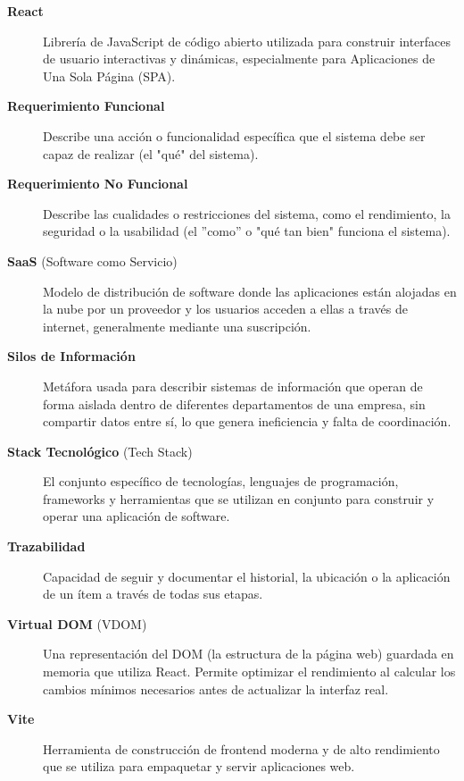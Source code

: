 \documentclass[12pt,letterpaper,spanish]{report}
\begin{document}
\begin{description}
  \item[\textbf{React}] Librería de JavaScript de código abierto utilizada para construir interfaces de usuario interactivas y dinámicas, especialmente para Aplicaciones de Una Sola Página (SPA).
  \item[\textbf{Requerimiento Funcional}] Describe una acción o funcionalidad específica que el sistema debe ser capaz de realizar (el "qué" del sistema).

  \item[\textbf{Requerimiento No Funcional}] Describe las cualidades o restricciones del sistema, como el rendimiento, la seguridad o la usabilidad (el ''como'' o "qué tan bien" funciona el sistema).

  \item[\textbf{SaaS} (Software como Servicio)] Modelo de distribución de software donde las aplicaciones están alojadas en la nube por un proveedor y los usuarios acceden a ellas a través de internet, generalmente mediante una suscripción.

  \item[\textbf{Silos de Información}] Metáfora usada para describir sistemas de información que operan de forma aislada dentro de diferentes departamentos de una empresa, sin compartir datos entre sí, lo que genera ineficiencia y falta de coordinación.

    \item[\textbf{Stack Tecnológico} (Tech Stack)] El conjunto específico de tecnologías, lenguajes de programación, frameworks y herramientas que se utilizan en conjunto para construir y operar una aplicación de software.

  \item[\textbf{Trazabilidad}] Capacidad de seguir y documentar el historial, la ubicación o la aplicación de un ítem a través de todas sus etapas.

  \item[\textbf{Virtual DOM} (VDOM)] Una representación del DOM (la estructura de la página web) guardada en memoria que utiliza React. Permite optimizar el rendimiento al calcular los cambios mínimos necesarios antes de actualizar la interfaz real.

  \item[\textbf{Vite}] Herramienta de construcción de frontend moderna y de alto rendimiento que se utiliza para empaquetar y servir aplicaciones web.

\end{description}


\end{document}
